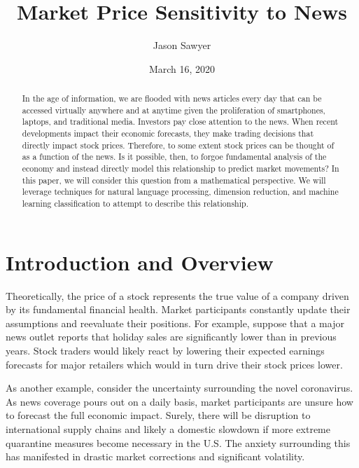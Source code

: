 \documentclass{article}
\title{Market Price Sensitivity to News}
\author{Jason Sawyer}
\date{March 16, 2020}
\begin{document}
\maketitle

\begin{abstract}
In the age of information, we are flooded with news articles every day that can be accessed virtually anywhere and at anytime given the proliferation of smartphones, laptops, and traditional media.  Investors pay close attention to the news.  When recent developments impact their economic forecasts, they make trading decisions that directly impact stock prices.  Therefore, to some extent stock prices can be thought of as a function of the news.  Is it possible, then, to forgoe fundamental analysis of the economy and instead directly model this relationship to predict market movements?  In this paper, we will consider this question from a mathematical perspective.  We will leverage techniques for natural language processing, dimension reduction, and machine learning classification to attempt to describe this relationship.
 \\
\begin{center}
\href{https://github.com/sawy0056/TextAnalysis}{\color{blue}{https://github.com/sawy0056/TextAnalysis}}
\end{center}
\end{abstract}

\section{Introduction and Overview}
Theoretically, the price of a stock represents the true value of a company driven by its fundamental financial health.  Market participants constantly update their assumptions and reevaluate their positions.  For example, suppose that a major news outlet reports that holiday sales are significantly lower than in previous years.  Stock traders would likely react by lowering their expected earnings forecasts for major retailers which would in turn drive their stock prices lower.  

As another example, consider the uncertainty surrounding the novel coronavirus.  As news coverage pours out on a daily basis, market participants are unsure how to forecast the full economic impact.  Surely, there will be disruption to international supply chains and likely a domestic slowdown if more extreme quarantine measures become necessary in the U.S.  The anxiety surrounding this has manifested in drastic market corrections and significant volatility. 
\end{document}

